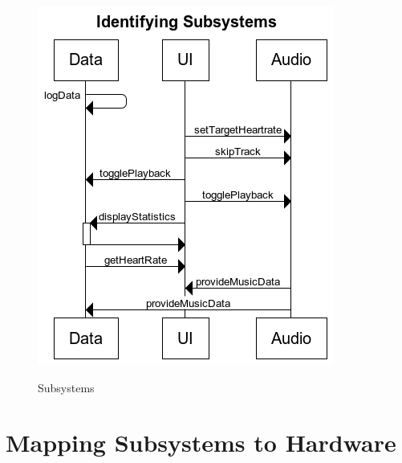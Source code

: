 \documentclass[letterpaper,english, 12pt]{scrreprt}
\begin{document}
\begin{center}
	\begin{figure}[H]
		\includegraphics{img/subsystems.png}\\
		\caption{Subsystems}
	\end{figure}
\end{center}

\section{Mapping Subsystems to Hardware}
\end{document}
